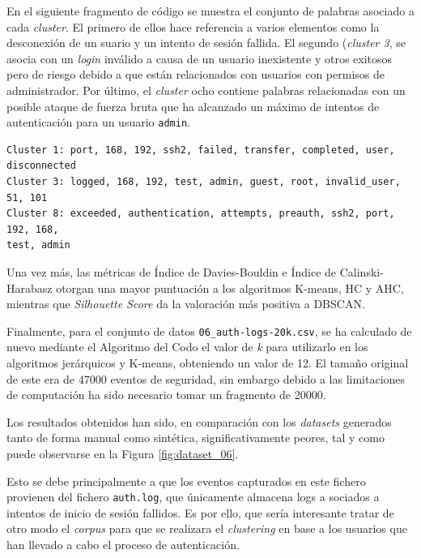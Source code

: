 \vspace{-1mm}

En el siguiente fragmento de código se muestra el conjunto de palabras asociado a cada \textit{cluster}. El primero de ellos hace referencia a varios elementos como la desconexión de un suario y un intento de sesión fallida. El segundo (\textit{cluster 3}, se asocia con un \textit{login} inválido a causa de un usuario inexistente y otros exitosos pero de riesgo debido a que están relacionados con usuarios con permisos de administrador. Por último, el \textit{cluster} ocho contiene palabras relacionadas con un posible ataque de fuerza bruta que ha alcanzado un máximo de intentos de autenticación para un usuario \texttt{admin}. \\

\begin{mdframed}
\scriptsize
\begin{verbatim}
Cluster 1: port, 168, 192, ssh2, failed, transfer, completed, user, disconnected
Cluster 3: logged, 168, 192, test, admin, guest, root, invalid_user, 51, 101
Cluster 8: exceeded, authentication, attempts, preauth, ssh2, port, 192, 168, 
test, admin
\end{verbatim}
\end{mdframed}


Una vez más, las métricas de Índice de Davies-Bouldin \cite{DaviesBouldin1979} e Índice de Calinski-Harabasz \cite{CalinskiHarabasz1974} otorgan una mayor puntuación a los algoritmos K-means, \gls{HC} y \gls{AHC}, mientras que \textit{Silhouette Score} da la valoración más positiva a \gls{DBSCAN}.

Finalmente, para el conjunto de datos \texttt{06\_auth-logs-20k.csv}, se ha calculado de nuevo mediante el Algoritmo del Codo el valor de \textit{k} para utilizarlo en los algoritmos jerárquicos y K-means, obteniendo un valor de 12. El tamaño original de este era de 47000 eventos de seguridad, sin embargo debido a las limitaciones de computación ha sido necesario tomar un fragmento de 20000.

Los resultados obtenidos han sido, en comparación con los \textit{datasets} generados tanto de forma manual como sintética, significativamente peores, tal y como puede observarse en la Figura \ref{fig:dataset_06}. 

\newpage

Esto se debe principalmente a que los eventos capturados en este fichero provienen del fichero \texttt{auth.log}, que únicamente almacena logs a sociados a intentos de inicio de sesión fallidos. Es por ello, que sería interesante tratar de otro modo el \textit{corpus} para que se realizara el \textit{clustering} en base a los usuarios que han llevado a cabo el proceso de autenticación.

